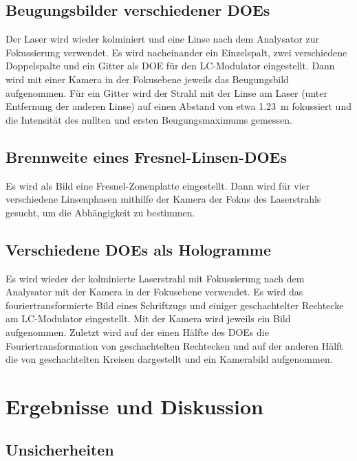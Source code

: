 \documentclass[
	a4paper,
	12pt,
	pagesize,
	ngerman
]{scrartcl}
\begin{document}
	\subsection{Beugungsbilder verschiedener DOEs}
		Der Laser wird wieder kolminiert und eine Linse nach dem Analysator zur Fokussierung verwendet.
		Es wird nacheinander ein Einzelspalt, zwei verschiedene Doppelspalte und ein Gitter als DOE für den LC-Modulator eingestellt.
		Dann wird mit einer Kamera in der Fokusebene jeweils das Beugungsbild aufgenommen.
		Für ein Gitter wird der Strahl mit der Linse am Laser (unter Entfernung der anderen Linse) auf einen Abstand von etwa \SI{1,23}{m} fokussiert und die Intensität des nullten und ersten Beugungsmaximums gemessen.

	\subsection{Brennweite eines Fresnel-Linsen-DOEs}
		Es wird als Bild eine Fresnel-Zonenplatte eingestellt.
		Dann wird für vier verschiedene Linsenphasen mithilfe der Kamera der Fokus des Laserstrahls gesucht, um die Abhängigkeit zu bestimmen.

	\subsection{Verschiedene DOEs als Hologramme}
		Es wird wieder der kolminierte Laserstrahl mit Fokussierung nach dem Analysator mit der Kamera in der Fokusebene verwendet.
		Es wird das fouriertransformierte Bild eines Schriftzugs und einiger geschachtelter Rechtecke am LC-Modulator eingestellt. %
		Mit der Kamera wird jeweils ein Bild aufgenommen.
		Zuletzt wird auf der einen Hälfte des DOEs die Fouriertransformation von geschachtelten Rechtecken und auf der anderen Hälft die von geschachtelten Kreisen dargestellt und ein Kamerabild aufgenommen.



	\section{Ergebnisse und Diskussion}
		\subsection*{Unsicherheiten}
\end{document}
